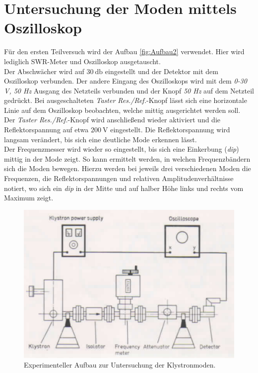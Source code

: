 \section{Untersuchung der Moden mittels Oszilloskop}
Für den ersten Teilversuch wird der Aufbau \autoref{fig:Aufbau2} verwendet. Hier wird lediglich SWR-Meter und Oszilloskop ausgetauscht.\\
Der Abschwächer wird auf $\qty{30}{\decibel}$ eingestellt und der Detektor mit dem Oszilloskop verbunden. Der andere Eingang des Oszilloskops wird mit dem \textit{0-30 V, 50 Hz} Ausgang des Netzteils verbunden und der Knopf 
\textit{50 Hz} auf dem Netzteil gedrückt. Bei ausgeschalteten \textit{Taster Res./Ref.}-Knopf lässt sich eine horizontale Linie auf dem Oszilloskop beobachten, welche mittig ausgerichtet werden soll.\\
Der \textit{Taster Res./Ref.}-Knopf wird anschließend wieder aktiviert und die Reflektorspannung auf etwa $\qty{200}{\volt}$ eingestellt. Die Reflektorspannung wird langsam verändert, bis sich eine deutliche Mode erkennen lässt.\\
Der Frequenzmesser wird wieder so eingestellt, bis sich eine Einkerbung (\textit{dip}) mittig in der Mode zeigt. So kann ermittelt werden, in welchen Frequenzbändern sich die Moden bewegen. Hierzu werden bei jeweils drei verschiedenen
Moden die Frequenzen, die Reflektorspannungen und relativen Amplitudenverhältnisse notiert, wo sich ein \textit{dip} in der Mitte und auf halber Höhe links und rechts vom Maximum zeigt.
\begin{figure}
    \centering
    \includegraphics[scale=0.4]{content/V53_pictures/Aufbau2.png}
    \caption{Experimenteller Aufbau zur Untersuchung der Klystronmoden. \cite{exp_mikro}}
    \label{fig:Aufbau2}
\end{figure}

